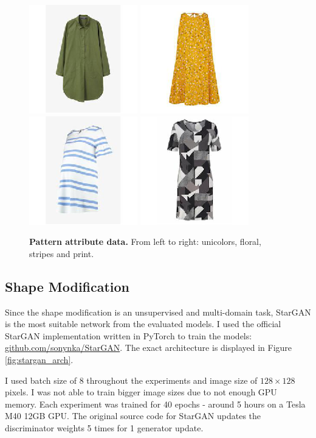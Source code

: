 \documentclass[12pt]{report}
\begin{document}
\begin{figure}[!h]
{\includegraphics[width=.2\linewidth]{03_analysis/data/pattern_unicolors}}
{\includegraphics[width=.2\linewidth]{03_analysis/data/pattern_floral}}
{\includegraphics[width=.2\linewidth]{03_analysis/data/pattern_stripes}}
{\includegraphics[width=.2\linewidth]{03_analysis/data/pattern_print}}
\caption{\label{fig:pattern_data} \textbf{Pattern attribute data.} From left to right: unicolors, floral, stripes and print.}
\end{figure}

\pagebreak
\subsection{Shape Modification}
Since the shape modification is an unsupervised and multi-domain task, StarGAN is the most suitable network from the evaluated models. I used the official StarGAN implementation written in PyTorch to train the models: \hyperlink{https://github.com/sonynka/StarGAN}{github.com/sonynka/StarGAN}. The exact architecture is displayed in Figure \ref{fig:stargan_arch}.

I used batch size of 8 throughout the experiments and image size of $128 \times 128$ pixels. I was not able to train bigger image sizes due to not enough GPU memory. Each experiment was trained for 40 epochs - around 5 hours on a Tesla M40 12GB GPU. The original source code for StarGAN updates the discriminator weights 5 times for 1 generator update. 
\end{document}
